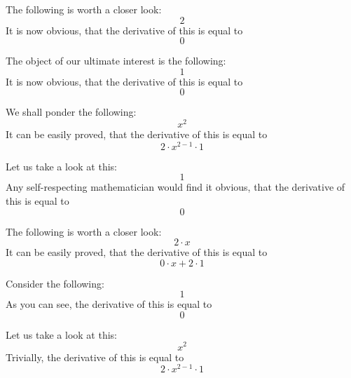 \documentclass{article}
\begin{document}
The following is worth a closer look:
\begin{equation}
2 
\end{equation}
It is now obvious, that the derivative of this is equal to
\begin{equation}
0 
\end{equation}

The object of our ultimate interest is the following:
\begin{equation}
1 
\end{equation}
It is now obvious, that the derivative of this is equal to
\begin{equation}
0 
\end{equation}

We shall ponder the following:
\begin{equation}
x ^{2 } 
\end{equation}
It can be easily proved, that the derivative of this is equal to
\begin{equation}
2 \cdot x ^{2 - 1 } \cdot 1 
\end{equation}

Let us take a look at this:
\begin{equation}
1 
\end{equation}
Any self-respecting mathematician would find it obvious, that the derivative of this is equal to
\begin{equation}
0 
\end{equation}

The following is worth a closer look:
\begin{equation}
2 \cdot x 
\end{equation}
It can be easily proved, that the derivative of this is equal to
\begin{equation}
0 \cdot x + 2 \cdot 1 
\end{equation}

Consider the following:
\begin{equation}
1 
\end{equation}
As you can see, the derivative of this is equal to
\begin{equation}
0 
\end{equation}

Let us take a look at this:
\begin{equation}
x ^{2 } 
\end{equation}
Trivially, the derivative of this is equal to
\begin{equation}
2 \cdot x ^{2 - 1 } \cdot 1 
\end{equation}
\end{document}

